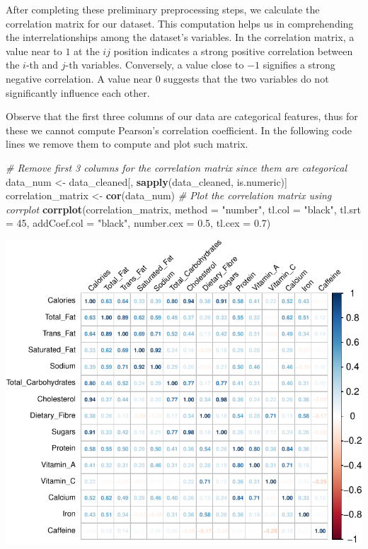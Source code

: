 \documentclass[
]{article}
\newenvironment{Shaded}{\begin{snugshade}}{\end{snugshade}}
\newcommand{\AttributeTok}[1]{\textcolor[rgb]{0.13,0.29,0.53}{#1}}
\newcommand{\CommentTok}[1]{\textcolor[rgb]{0.56,0.35,0.01}{\textit{#1}}}
\newcommand{\DecValTok}[1]{\textcolor[rgb]{0.00,0.00,0.81}{#1}}
\newcommand{\FloatTok}[1]{\textcolor[rgb]{0.00,0.00,0.81}{#1}}
\newcommand{\FunctionTok}[1]{\textcolor[rgb]{0.13,0.29,0.53}{\textbf{#1}}}
\newcommand{\NormalTok}[1]{#1}
\newcommand{\OtherTok}[1]{\textcolor[rgb]{0.56,0.35,0.01}{#1}}
\newcommand{\StringTok}[1]{\textcolor[rgb]{0.31,0.60,0.02}{#1}}
\begin{document}
After completing these preliminary preprocessing steps, we calculate the
correlation matrix for our dataset. This computation helps us in
comprehending the interrelationships among the dataset's variables. In
the correlation matrix, a value near to \(1\) at the \(ij\) position
indicates a strong positive correlation between the \(i\)-th and
\(j\)-th variables. Conversely, a value close to \(-1\) signifies a
strong negative correlation. A value near \(0\) suggests that the two
variables do not significantly influence each other.

Observe that the first three columns of our data are categorical
features, thus for these we cannot compute Pearson's correlation
coefficient. In the following code lines we remove them to compute and
plot such matrix.

\begin{Shaded}
\begin{Highlighting}[]
\CommentTok{\# Remove first 3 columns for the correlation matrix since them are categorical}
\NormalTok{data\_num }\OtherTok{\textless{}{-}}\NormalTok{ data\_cleaned[, }\FunctionTok{sapply}\NormalTok{(data\_cleaned, is.numeric)]}
\NormalTok{correlation\_matrix }\OtherTok{\textless{}{-}} \FunctionTok{cor}\NormalTok{(data\_num)}
\CommentTok{\# Plot the correlation matrix using corrplot}
\FunctionTok{corrplot}\NormalTok{(correlation\_matrix, }\AttributeTok{method =} \StringTok{"number"}\NormalTok{, }\AttributeTok{tl.col =} \StringTok{"black"}\NormalTok{, }
         \AttributeTok{tl.srt =} \DecValTok{45}\NormalTok{, }\AttributeTok{addCoef.col =} \StringTok{"black"}\NormalTok{, }\AttributeTok{number.cex =} \FloatTok{0.5}\NormalTok{, }\AttributeTok{tl.cex =} \FloatTok{0.7}\NormalTok{)}
\end{Highlighting}
\end{Shaded}

\begin{center}\includegraphics{Statistical_Learning_Final_Report_files/figure-latex/correlation_analysis-1} \end{center}
\end{document}
